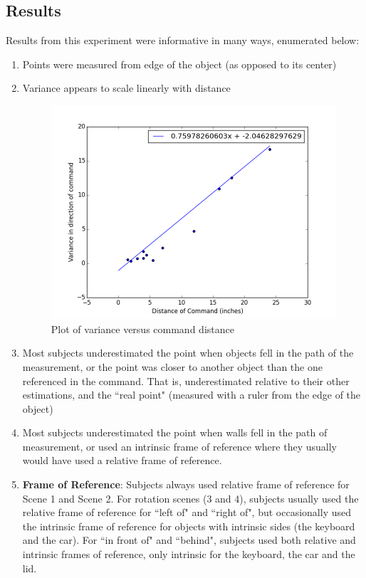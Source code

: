 \documentclass[12pt,letterpaper]{article}
\begin{document}
\subsection{Results}

Results from this experiment were informative in many ways, enumerated below:

\begin{enumerate}[(1)]
\item Points were measured from edge of the object (as opposed to its center)
\item Variance appears to scale linearly with distance
\begin{figure}[H]
\centering
\includegraphics[scale=0.5]{images/varplot.png}
\caption{Plot of variance versus command distance}
\label{fig:varplot}
\end{figure}
\item Most subjects underestimated the point when objects fell in the path of the measurement, or the point was closer to another object than the one referenced in the command. That is, underestimated relative to their other estimations, and the ``real point" (measured with a ruler from the edge of the object)

\item Most subjects underestimated the point when walls fell in the path of measurement, or used an intrinsic frame of reference where they usually would have used a relative frame of reference.


\item \textbf{Frame of Reference}: Subjects always used relative frame of reference for Scene 1 and Scene 2. For rotation scenes (3 and 4), subjects usually used the relative frame of reference for ``left of" and ``right of", but occasionally used the intrinsic frame of reference for objects with intrinsic sides (the keyboard and the car). For ``in front of" and ``behind", subjects used both relative and intrinsic frames of reference, only intrinsic for the keyboard, the car and the lid. 


\end{enumerate}
\end{document}
